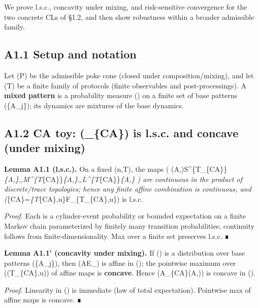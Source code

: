 \documentclass[
]{article}
\numberwithin{equation}{section}
\begin{document}
We prove l.s.c., concavity under mixing, and risk-sensitive convergence
for the two concrete CLs of §1.2, and then show robustness within a
broader admissible family.

\hypertarget{a1.1-setup-and-notation}{%
\subsection{A1.1 Setup and notation}\label{a1.1-setup-and-notation}}

Let (\mathscr P) be the admissible poke cone (closed under
composition/mixing), and let (\mathscr T) be a finite family of
protocols (finite observables and post-processings). A \textbf{mixed
pattern} is a probability measure (\mu) on a finite set of base patterns
(\{A\_j\}); its dynamics are mixtures of the base dynamics.

\hypertarget{a1.2-ca-toy-_-is-l.s.c.-and-concave-under-mixing}{%
\subsection{\texorpdfstring{A1.2 CA toy: (\_\{\rm CA\}) is
l.s.c. and concave (under
mixing)}{A1.2 CA toy: (\_\{\}) is l.s.c. and concave (under mixing)}}\label{a1.2-ca-toy-_-is-l.s.c.-and-concave-under-mixing}}

\textbf{Lemma A1.1 (l.s.c.).} On a fixed (n,T), the maps (
(A,\Phi)\mapsto S\^{}\{T\_\{\rm CA\}\}\emph{\{A,\Phi\},,M\^{}\{T}\{\rm CA\}\}\emph{\{A,\Phi\},,L\^{}\{T}\{\rm CA\}\}\emph{\{A,\Phi\}
) are continuous in the product of discrete/trace topologies; hence any
finite affine combination is continuous, and
(}\{\rm CA\}=\max\emph{\{T}\{\rm CA\},u\}F\_\{T\_\{\rm CA\},u\})
is l.s.c.

\emph{Proof.} Each is a cylinder-event probability or bounded
expectation on a finite Markov chain parameterized by finitely many
transition probabilities; continuity follows from finite-dimensionality.
Max over a finite set preserves l.s.c. ∎

\textbf{Lemma A1.1′ (concavity under mixing).} If (\mu) is a
distribution over base patterns (\{A\_j\}), then
(A\mapsto \mathbb E\_\mu[F_{T_{\rm CA},u}(A,\Phi)]) is affine in (\mu);
the pointwise maximum over ((T\_\{\rm CA\},u)) of affine maps is
\textbf{concave}. Hence (A\mapsto {}\_\{\rm CA\}(A,\Phi)) is
concave in (\mu).

\emph{Proof.} Linearity in (\mu) is immediate (law of total
expectation). Pointwise max of affine maps is concave. ∎
\end{document}

